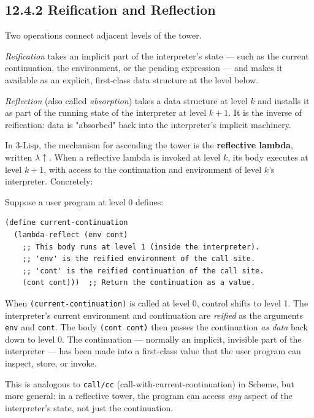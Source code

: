 \subsection{12.4.2 Reification and Reflection}

Two operations connect adjacent levels of the tower.

\begin{definition}[Reification]
\textit{Reification} takes an implicit part of the interpreter's state --- such as the current continuation, the environment, or the pending expression --- and makes it available as an explicit, first-class data structure at the level below.
\end{definition}

\begin{definition}[Reflection]
\textit{Reflection} (also called \textit{absorption}) takes a data structure at level $k$ and installs it as part of the running state of the interpreter at level $k + 1$. It is the inverse of reification: data is "absorbed" back into the interpreter's implicit machinery.

In 3-Lisp, the mechanism for ascending the tower is the \textbf{reflective lambda}, written $\lambda\!\uparrow$. When a reflective lambda is invoked at level $k$, its body executes at level $k + 1$, with access to the continuation and environment of level $k$'s interpreter. Concretely:
\end{definition}

\begin{example}
Suppose a user program at level 0 defines:

\begin{lstlisting}
(define current-continuation
  (lambda-reflect (env cont)
    ;; This body runs at level 1 (inside the interpreter).
    ;; 'env' is the reified environment of the call site.
    ;; 'cont' is the reified continuation of the call site.
    (cont cont)))  ;; Return the continuation as a value.
\end{lstlisting}

When \texttt{(current-continuation)} is called at level 0, control shifts to level 1. The interpreter's current environment and continuation are \textit{reified} as the arguments \texttt{env} and \texttt{cont}. The body \texttt{(cont cont)} then passes the continuation \textit{as data} back down to level 0. The continuation --- normally an implicit, invisible part of the interpreter --- has been made into a first-class value that the user program can inspect, store, or invoke.

This is analogous to \texttt{call/cc} (call-with-current-continuation) in Scheme, but more general: in a reflective tower, the program can access \textit{any} aspect of the interpreter's state, not just the continuation.
\end{example}

